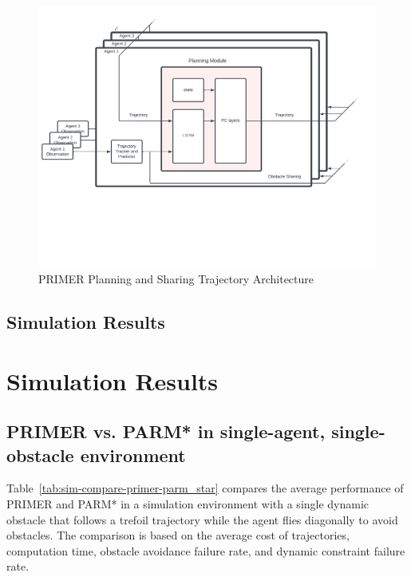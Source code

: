 \begin{figure}[h]
    \centering
    \includegraphics[width=\columnwidth, trim={0 6cm 0 0.5cm}, clip]{figures/primer-architecture.pdf}
\caption{\centering PRIMER Planning and Sharing Trajectory Architecture}
\label{fig:primer-planning-sharing-architecture}
\end{figure}


\subsection{Simulation Results}


\section{Simulation Results}\label{sec:simultation-results}


\subsection{PRIMER vs. PARM* in single-agent, single-obstacle environment} 

Table~\ref{tab:sim-compare-primer-parm_star} compares the average performance of PRIMER and PARM* in a simulation environment with a single dynamic obstacle that follows a trefoil trajectory while the agent flies diagonally to avoid obstacles. The comparison is based on the average cost of trajectories, computation time, obstacle avoidance failure rate, and dynamic constraint failure rate.

